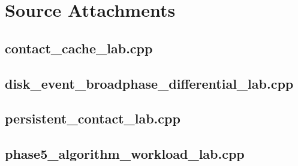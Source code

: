 \documentclass[11pt,twoside,openany]{book}
\begin{document}
\chapter{Source Attachments}
\hypertarget{source-file-830b13449e1c6505af693753}{}
\label{attachmentstart:source-file-830b13449e1c6505af693753}
\section*{contact\_cache\_lab.cpp}
\hypertarget{source-file-352cdda3503a7fe277bf96f6}{}
\label{attachmentstart:source-file-352cdda3503a7fe277bf96f6}
\section*{disk\_event\_broadphase\_differential\_lab.cpp}
\hypertarget{source-file-44c320ffad9698c7abd453e2}{}
\label{attachmentstart:source-file-44c320ffad9698c7abd453e2}
\section*{persistent\_contact\_lab.cpp}
\hypertarget{source-file-0ec69e1a1a11439bca29faa5}{}
\label{attachmentstart:source-file-0ec69e1a1a11439bca29faa5}
\section*{phase5\_algorithm\_workload\_lab.cpp}
\end{document}
